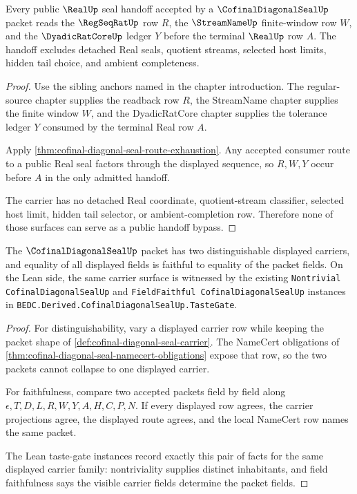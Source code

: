 \begin{theorem}
\label{thm:cofinal-diagonal-seal-observable-route-handoff}
Every public $\RealUp$ seal handoff accepted by a $\CofinalDiagonalSealUp$ packet reads the $\RegSeqRatUp$ row $R$, the $\StreamNameUp$ finite-window row $W$, and the $\DyadicRatCoreUp$ ledger $Y$ before the terminal $\RealUp$ row $A$. The handoff excludes detached Real seals, quotient streams, selected host limits, hidden tail choice, and ambient completeness.
\end{theorem}
\begin{proof}
Use the sibling anchors named in the chapter introduction. The regular-source chapter supplies the readback row $R$, the StreamName chapter supplies the finite window $W$, and the DyadicRatCore chapter supplies the tolerance ledger $Y$ consumed by the terminal Real row $A$.

Apply \autoref{thm:cofinal-diagonal-seal-route-exhaustion}. Any accepted consumer route to a public Real seal factors through the displayed sequence, so $R,W,Y$ occur before $A$ in the only admitted handoff.

The carrier has no detached Real coordinate, quotient-stream classifier, selected host limit, hidden tail selector, or ambient-completion row. Therefore none of those surfaces can serve as a public handoff bypass.
\end{proof}

\begin{theorem}
\label{thm:cofinal-diagonal-seal-nontrivial-faithful-field}
The $\CofinalDiagonalSealUp$ packet has two distinguishable displayed carriers, and equality of all displayed fields is faithful to equality of the packet fields. On the Lean side, the same carrier surface is witnessed by the existing \texttt{Nontrivial CofinalDiagonalSealUp} and \texttt{FieldFaithful CofinalDiagonalSealUp} instances in \texttt{BEDC.Derived.CofinalDiagonalSealUp.TasteGate}.
\end{theorem}
\begin{proof}
For distinguishability, vary a displayed carrier row while keeping the packet shape of \autoref{def:cofinal-diagonal-seal-carrier}. The NameCert obligations of \autoref{thm:cofinal-diagonal-seal-namecert-obligations} expose that row, so the two packets cannot collapse to one displayed carrier.

For faithfulness, compare two accepted packets field by field along $\epsilon,T,D,L,R,W,Y,A,H,C,P,N$. If every displayed row agrees, the carrier projections agree, the displayed route agrees, and the local NameCert row names the same packet.

The Lean taste-gate instances record exactly this pair of facts for the same displayed carrier family: nontriviality supplies distinct inhabitants, and field faithfulness says the visible carrier fields determine the packet fields.
\end{proof}

